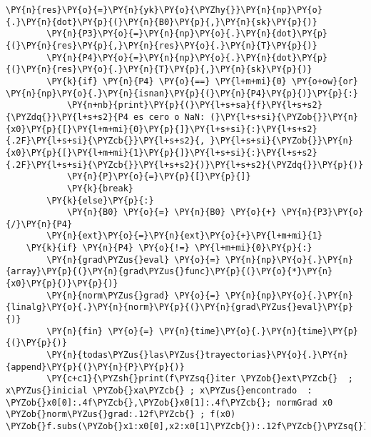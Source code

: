 \begin{itemize}
\begin{tcolorbox}[breakable, size=fbox, boxrule=1pt, pad at break*=1mm,colback=cellbackground, colframe=cellborder]
\begin{Verbatim}[commandchars=\\\{\}]
        \PY{n}{res}\PY{o}{=}\PY{n}{yk}\PY{o}{\PYZhy{}}\PY{n}{np}\PY{o}{.}\PY{n}{dot}\PY{p}{(}\PY{n}{B0}\PY{p}{,}\PY{n}{sk}\PY{p}{)}
        \PY{n}{P3}\PY{o}{=}\PY{n}{np}\PY{o}{.}\PY{n}{dot}\PY{p}{(}\PY{n}{res}\PY{p}{,}\PY{n}{res}\PY{o}{.}\PY{n}{T}\PY{p}{)}
        \PY{n}{P4}\PY{o}{=}\PY{n}{np}\PY{o}{.}\PY{n}{dot}\PY{p}{(}\PY{n}{res}\PY{o}{.}\PY{n}{T}\PY{p}{,}\PY{n}{sk}\PY{p}{)}
        \PY{k}{if} \PY{n}{P4} \PY{o}{==} \PY{l+m+mi}{0} \PY{o+ow}{or} \PY{n}{np}\PY{o}{.}\PY{n}{isnan}\PY{p}{(}\PY{n}{P4}\PY{p}{)}\PY{p}{:}
            \PY{n+nb}{print}\PY{p}{(}\PY{l+s+sa}{f}\PY{l+s+s2}{\PYZdq{}}\PY{l+s+s2}{P4 es cero o NaN: (}\PY{l+s+si}{\PYZob{}}\PY{n}{x0}\PY{p}{[}\PY{l+m+mi}{0}\PY{p}{]}\PY{l+s+si}{:}\PY{l+s+s2}{.2F}\PY{l+s+si}{\PYZcb{}}\PY{l+s+s2}{, }\PY{l+s+si}{\PYZob{}}\PY{n}{x0}\PY{p}{[}\PY{l+m+mi}{1}\PY{p}{]}\PY{l+s+si}{:}\PY{l+s+s2}{.2F}\PY{l+s+si}{\PYZcb{}}\PY{l+s+s2}{)}\PY{l+s+s2}{\PYZdq{}}\PY{p}{)}
            \PY{n}{P}\PY{o}{=}\PY{p}{[}\PY{p}{]}
            \PY{k}{break}
        \PY{k}{else}\PY{p}{:}
            \PY{n}{B0} \PY{o}{=} \PY{n}{B0} \PY{o}{+} \PY{n}{P3}\PY{o}{/}\PY{n}{P4}
        \PY{n}{ext}\PY{o}{=}\PY{n}{ext}\PY{o}{+}\PY{l+m+mi}{1}
    \PY{k}{if} \PY{n}{P4} \PY{o}{!=} \PY{l+m+mi}{0}\PY{p}{:}
        \PY{n}{grad\PYZus{}eval} \PY{o}{=} \PY{n}{np}\PY{o}{.}\PY{n}{array}\PY{p}{(}\PY{n}{grad\PYZus{}func}\PY{p}{(}\PY{o}{*}\PY{n}{x0}\PY{p}{)}\PY{p}{)}
        \PY{n}{norm\PYZus{}grad} \PY{o}{=} \PY{n}{np}\PY{o}{.}\PY{n}{linalg}\PY{o}{.}\PY{n}{norm}\PY{p}{(}\PY{n}{grad\PYZus{}eval}\PY{p}{)}
        \PY{n}{fin} \PY{o}{=} \PY{n}{time}\PY{o}{.}\PY{n}{time}\PY{p}{(}\PY{p}{)}
        \PY{n}{todas\PYZus{}las\PYZus{}trayectorias}\PY{o}{.}\PY{n}{append}\PY{p}{(}\PY{n}{P}\PY{p}{)}
        \PY{c+c1}{\PYZsh{}print(f\PYZsq{}iter \PYZob{}ext\PYZcb{}  ; x\PYZus{}inicial \PYZob{}xa\PYZcb{} ; x\PYZus{}encontrado  : \PYZob{}x0[0]:.4f\PYZcb{},\PYZob{}x0[1]:.4f\PYZcb{}; normGrad x0  \PYZob{}norm\PYZus{}grad:.12f\PYZcb{} ; f(x0) \PYZob{}f.subs(\PYZob{}x1:x0[0],x2:x0[1]\PYZcb{}):.12f\PYZcb{}\PYZsq{})}

\end{Verbatim}
\end{tcolorbox}
\end{itemize}
